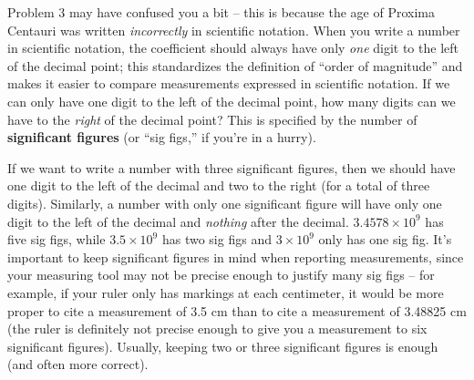 \documentclass[11pt]{article}
\begin{document}
\bigskip

Problem 3 may have confused you a bit -- this is because the age of Proxima Centauri was written \emph{incorrectly} in scientific notation. When you write a number in scientific notation, the coefficient should always have only \emph{one} digit to the left of the decimal point; this standardizes the definition of ``order of magnitude'' and makes it easier to compare measurements expressed in scientific notation. If we can only have one digit to the left of the decimal point, how many digits can we have to the \emph{right} of the decimal point? This is specified by the number of \textbf{significant figures} (or ``sig figs,'' if you're in a hurry). 

If we want to write a number with three significant figures, then we should have one digit to the left of the decimal and two to the right (for a total of three digits). Similarly, a number with only one significant figure will have only one digit to the left of the decimal and \emph{nothing} after the decimal. $3.4578 \times 10^9$ has five sig figs, while $3.5 \times 10^9$ has two sig figs and $3 \times 10^9$ only has one sig fig. It's important to keep significant figures in mind when reporting measurements, since your measuring tool may not be precise enough to justify many sig figs -- for example, if your ruler only has markings at each centimeter, it would be more proper to cite a measurement of 3.5 cm than to cite a measurement of 3.48825 cm (the ruler is definitely not precise enough to give you a measurement to six significant figures). Usually, keeping two or three significant figures is enough (and often more correct).

\bigskip
\end{document}
